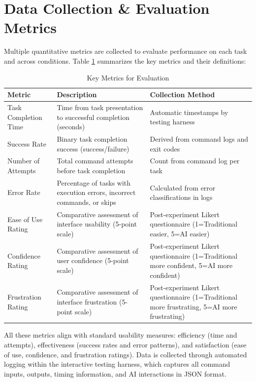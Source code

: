 \section{Data Collection \& Evaluation Metrics}

Multiple quantitative metrics are collected to evaluate performance on each task and across conditions. Table \ref{tab:metrics} summarizes the key metrics and their definitions:

\begin{table}[h]
	\centering
	\small
	\begin{tabular}{|p{2.5cm}|p{4cm}|p{4.5cm}|}
		\hline
		\textbf{Metric} & \textbf{Description} & \textbf{Collection Method} \\
		\hline
		Task Completion Time & Time from task presentation to successful completion (seconds) & Automatic timestamps by testing harness \\
		\hline
		Success Rate & Binary task completion success (success/failure) & Derived from command logs and exit codes \\
		\hline
		Number of Attempts & Total command attempts before task completion & Count from command log per task \\
		\hline
		Error Rate & Percentage of tasks with execution errors, incorrect commands, or skips & Calculated from error classifications in logs \\
		\hline
		Ease of Use Rating & Comparative assessment of interface usability (5-point scale) & Post-experiment Likert questionnaire (1=Traditional easier, 5=AI easier) \\
		\hline
		Confidence Rating & Comparative assessment of user confidence (5-point scale) & Post-experiment Likert questionnaire (1=Traditional more confident, 5=AI more confident) \\
		\hline
		Frustration Rating & Comparative assessment of interface frustration (5-point scale) & Post-experiment Likert questionnaire (1=Traditional more frustrating, 5=AI more frustrating) \\
		\hline
	\end{tabular}
	\caption{Key Metrics for Evaluation}
	\label{tab:metrics}
\end{table}

All these metrics align with standard usability measures: efficiency (time and attempts), effectiveness (success rates and error patterns), and satisfaction (ease of use, confidence, and frustration ratings). Data is collected through automated logging within the interactive testing harness, which captures all command inputs, outputs, timing information, and AI interactions in JSON format.


